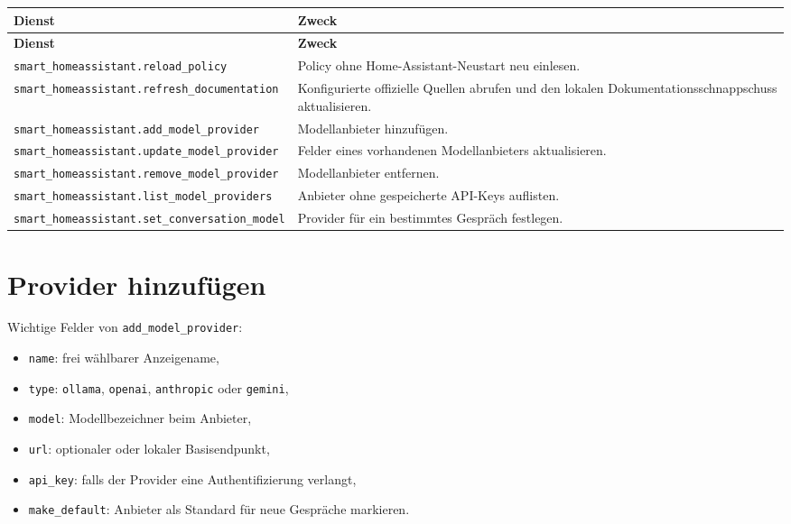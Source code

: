 \documentclass[
  11pt,
  a4paper,
  oneside,
  parskip=half
]{scrreprt}
\newcommand{\code}[1]{\texttt{#1}}
\begin{document}
\begin{longtable}{@{}L{61mm}L{82mm}@{}}
  \toprule
  \textbf{Dienst} & \textbf{Zweck} \\
  \midrule
  \endfirsthead
  \toprule
  \textbf{Dienst} & \textbf{Zweck} \\
  \midrule
  \endhead
  \code{smart\_homeassistant.reload\_policy} &
    Policy ohne Home-Assistant-Neustart neu einlesen. \\
  \code{smart\_homeassistant.refresh\_documentation} &
    Konfigurierte offizielle Quellen abrufen und den lokalen
    Dokumentationsschnappschuss aktualisieren. \\
  \code{smart\_homeassistant.add\_model\_provider} &
    Modellanbieter hinzufügen. \\
  \code{smart\_homeassistant.update\_model\_provider} &
    Felder eines vorhandenen Modellanbieters aktualisieren. \\
  \code{smart\_homeassistant.remove\_model\_provider} &
    Modellanbieter entfernen. \\
  \code{smart\_homeassistant.list\_model\_providers} &
    Anbieter ohne gespeicherte API-Keys auflisten. \\
  \code{smart\_homeassistant.set\_conversation\_model} &
    Provider für ein bestimmtes Gespräch festlegen. \\
  \bottomrule
\end{longtable}

\section{Provider hinzufügen}

Wichtige Felder von \code{add\_model\_provider}:

\begin{itemize}
  \item \code{name}: frei wählbarer Anzeigename,
  \item \code{type}: \code{ollama}, \code{openai}, \code{anthropic} oder \code{gemini},
  \item \code{model}: Modellbezeichner beim Anbieter,
  \item \code{url}: optionaler oder lokaler Basisendpunkt,
  \item \code{api\_key}: falls der Provider eine Authentifizierung verlangt,
  \item \code{make\_default}: Anbieter als Standard für neue Gespräche markieren.
\end{itemize}
\end{document}
